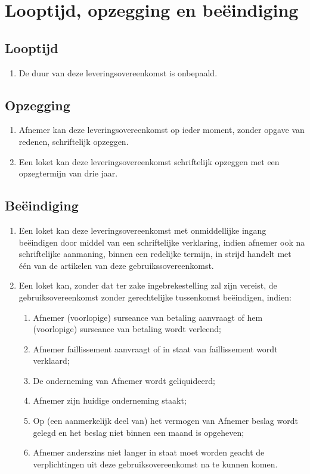 \documentclass[10pt, a4paper]{article}
\begin{document}
\section{Looptijd, opzegging en beëindiging}
\subsection*{Looptijd}
\begin{enumerate}
   \item De duur van deze leveringsovereenkomst is onbepaald.
\end{enumerate}

\subsection*{Opzegging}
\begin{enumerate}
   \item Afnemer kan deze leveringsovereenkomst op ieder moment, zonder opgave van redenen, schriftelijk opzeggen.
   \item Een loket kan deze leveringsovereenkomst schriftelijk opzeggen met een opzegtermijn van drie jaar.
\end{enumerate}

\subsection*{Beëindiging}
\begin{enumerate}
   \item Een loket kan deze leveringsovereenkomst met onmiddellijke ingang beëindigen door middel van een schriftelijke verklaring, indien afnemer ook na schriftelijke aanmaning, binnen een redelijke termijn, in strijd handelt met één van de artikelen van deze gebruikssovereenkomst.
   \item Een loket kan, zonder dat ter zake ingebrekestelling zal zijn vereist, de gebruiksovereenkomst zonder gerechtelijke tussenkomst beëindigen, indien:
      \begin{enumerate}
      \item Afnemer (voorlopige) surseance van betaling aanvraagt of hem (voorlopige) surseance van betaling wordt verleend;
      \item Afnemer faillissement aanvraagt of in staat van faillissement wordt verklaard;
      \item De onderneming van Afnemer wordt geliquideerd;
      \item Afnemer zijn huidige onderneming staakt;
      \item Op (een aanmerkelijk deel van) het vermogen van Afnemer beslag wordt gelegd en het beslag niet binnen een maand is opgeheven;
      \item Afnemer anderszins niet langer in staat moet worden geacht de verplichtingen uit deze gebruiksovereenkomst na te kunnen komen.
      \end{enumerate}
\end{enumerate}
\newpage
\end{document}
